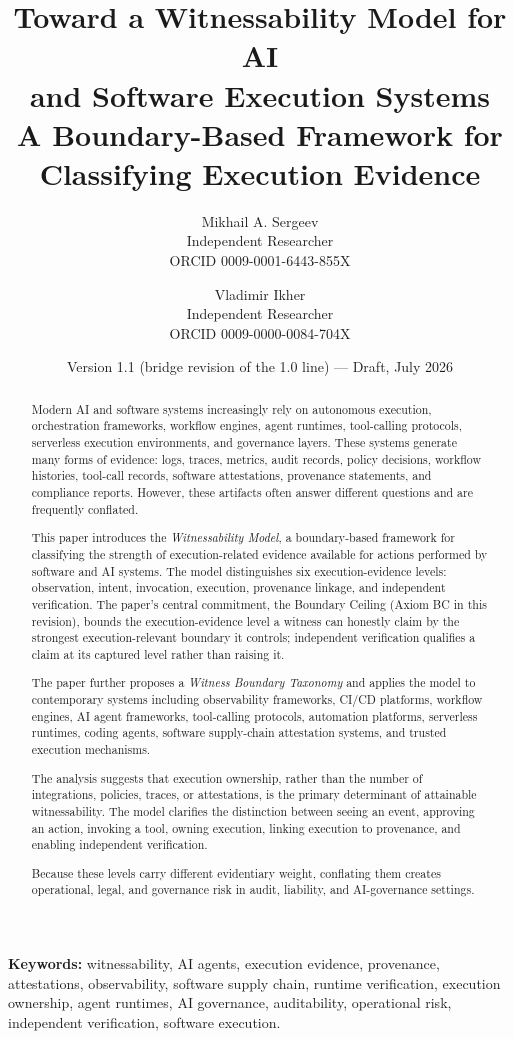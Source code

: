 \documentclass[11pt]{article}
\title{Toward a Witnessability Model for AI\\
and Software Execution Systems\\[0.5em]
\large A Boundary-Based Framework for Classifying Execution Evidence}
\author{Mikhail A. Sergeev\\
Independent Researcher\\
ORCID 0009-0001-6443-855X
\and
Vladimir Ikher\\
Independent Researcher\\
ORCID 0009-0000-0084-704X}
\date{Version 1.1 (bridge revision of the 1.0 line) --- Draft, July 2026}
\begin{document}
\maketitle

\begin{abstract}
Modern AI and software systems increasingly rely on autonomous execution, orchestration frameworks, workflow engines, agent runtimes, tool-calling protocols, serverless execution environments, and governance layers. These systems generate many forms of evidence: logs, traces, metrics, audit records, policy decisions, workflow histories, tool-call records, software attestations, provenance statements, and compliance reports. However, these artifacts often answer different questions and are frequently conflated.

This paper introduces the \emph{Witnessability Model}, a boundary-based framework for classifying the strength of execution-related evidence available for actions performed by software and AI systems. The model distinguishes six execution-evidence levels: observation, intent, invocation, execution, provenance linkage, and independent verification. The paper's central commitment, the Boundary Ceiling (Axiom BC in this revision), bounds the execution-evidence level a witness can honestly claim by the strongest execution-relevant boundary it controls; independent verification qualifies a claim at its captured level rather than raising it.

The paper further proposes a \emph{Witness Boundary Taxonomy} and applies the model to contemporary systems including observability frameworks, CI/CD platforms, workflow engines, AI agent frameworks, tool-calling protocols, automation platforms, serverless runtimes, coding agents, software supply-chain attestation systems, and trusted execution mechanisms.

The analysis suggests that execution ownership, rather than the number of integrations, policies, traces, or attestations, is the primary determinant of attainable witnessability. The model clarifies the distinction between seeing an event, approving an action, invoking a tool, owning execution, linking execution to provenance, and enabling independent verification.

Because these levels carry different evidentiary weight, conflating them creates operational, legal, and governance risk in audit, liability, and AI-governance settings.
\end{abstract}

\noindent\textbf{Keywords:} witnessability, AI agents, execution evidence, provenance, attestations, observability, software supply chain, runtime verification, execution ownership, agent runtimes, AI governance, auditability, operational risk, independent verification, software execution.
\end{document}
